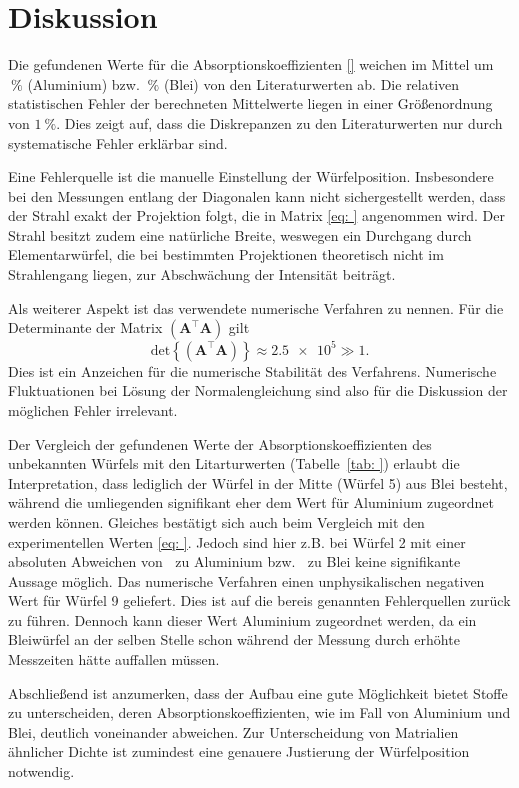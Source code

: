 \section{Diskussion}
Die gefundenen Werte für die Absorptionskoeffizienten \eqref{} weichen im Mittel
um $\SI{}{\percent}$ (Aluminium) bzw. $\SI{}{\percent}$ (Blei) von den Literaturwerten ab.
Die relativen statistischen Fehler der berechneten Mittelwerte liegen in einer Größenordnung von
$\SI{1}{\percent}$. Dies zeigt auf, dass die Diskrepanzen zu den Literaturwerten nur durch
systematische Fehler erklärbar sind.

Eine Fehlerquelle ist die manuelle Einstellung der Würfelposition. Insbesondere bei den Messungen
entlang der Diagonalen kann nicht sichergestellt werden, dass der Strahl exakt der Projektion folgt,
die in Matrix \eqref{eq: } angenommen wird. Der Strahl besitzt zudem eine natürliche Breite, weswegen
ein Durchgang durch Elementarwürfel, die bei bestimmten Projektionen theoretisch nicht im Strahlengang liegen, zur
Abschwächung der Intensität beiträgt.

Als weiterer Aspekt ist das verwendete numerische Verfahren zu nennen. Für die Determinante der Matrix
$\left(\symbf{A}^\top \symbf{A}\right)$ gilt
\begin{equation}
  \mathup{det}\left\{\left(\symbf{A}^\top \symbf{A}\right)\right\} \approx \num{2.5e5} \gg 1.
\end{equation}
Dies ist ein Anzeichen für die numerische Stabilität des Verfahrens. Numerische Fluktuationen bei
Lösung der Normalengleichung sind also für die Diskussion der möglichen Fehler irrelevant.

Der Vergleich der gefundenen Werte der Absorptionskoeffizienten des unbekannten Würfels mit den
Litarturwerten (Tabelle~\ref{tab: }) erlaubt die Interpretation, dass lediglich der
Würfel in der Mitte (Würfel 5) aus Blei besteht, während die umliegenden signifikant eher dem Wert
für Aluminium zugeordnet werden können. Gleiches bestätigt sich auch beim Vergleich mit den experimentellen
Werten \eqref{eq: }. Jedoch sind hier z.B. bei Würfel 2 mit einer absoluten Abweichen von $\SI{}{}$ zu Aluminium
bzw. $\SI{}{}$ zu Blei keine signifikante Aussage möglich. Das numerische Verfahren einen unphysikalischen
negativen Wert für Würfel 9 geliefert. Dies ist auf die bereis genannten Fehlerquellen zurück zu führen.
Dennoch kann dieser Wert Aluminium zugeordnet werden, da ein Bleiwürfel an der selben Stelle schon während
der Messung durch erhöhte Messzeiten hätte auffallen müssen.

Abschließend ist anzumerken, dass der Aufbau eine gute Möglichkeit bietet Stoffe zu unterscheiden, deren
Absorptionskoeffizienten, wie im Fall von Aluminium und Blei, deutlich voneinander abweichen. Zur Unterscheidung
von Matrialien ähnlicher Dichte ist zumindest eine genauere Justierung der Würfelposition notwendig.
